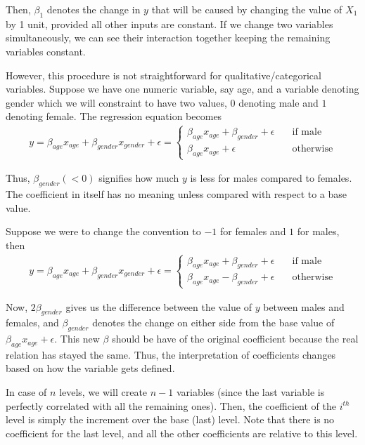 \documentclass[../statistical_learning_notes.tex]{subfiles}
\begin{document}
Then, $\beta_{1}$ denotes the change in $y$ that will be caused by changing the value of $X_{1}$ by 1 unit, provided all other inputs are constant. If we change two variables simultaneously, we can see their interaction together keeping the remaining variables constant.\newline

However, this procedure is not straightforward for qualitative/categorical variables. Suppose we have one numeric variable, say age, and a variable denoting gender which we will constraint to have two values, $0$ denoting male and $1$ denoting female. The regression equation becomes
\begin{align*}
    y =\beta_{age}x_{age} + \beta_{gender}x_{gender} + \epsilon = \begin{cases}
        \beta_{age}x_{age} + \beta_{gender} + \epsilon \quad &\text{if male}\\
        \beta_{age}x_{age} + \epsilon \quad &\text{otherwise}
    \end{cases}
\end{align*}

Thus, $\beta_{gender} (<0)$ signifies how much $y$ is less for males compared to females. The coefficient in itself has no meaning unless compared with respect to a base value.\newline

Suppose we were to change the convention to $-1$ for females and $1$ for males, then
\begin{align*}
    y =\beta_{age}x_{age} + \beta_{gender}x_{gender} + \epsilon = \begin{cases}
        \beta_{age}x_{age} + \beta_{gender} + \epsilon \quad &\text{if male}\\
        \beta_{age}x_{age} -\beta_{gender} + \epsilon \quad &\text{otherwise}
    \end{cases}
\end{align*}

Now, $2\beta_{gender}$ gives us the difference between the value of $y$ between males and females, and $\beta_{gender}$ denotes the change on either side from the base value of $\beta_{age}x_{age} + \epsilon$. This new $\beta$ should be have of the original coefficient because the real relation has stayed the same. Thus, the interpretation of coefficients changes based on how the variable gets defined.\newline

In case of $n$ levels, we will create $n-1$ variables (since the last variable is perfectly correlated with all the remaining ones). Then, the coefficient of the $i^{th}$ level is simply the increment over the base (last) level. Note that there is no coefficient for the last level, and all the other coefficients are relative to this level.\newline
\end{document}
